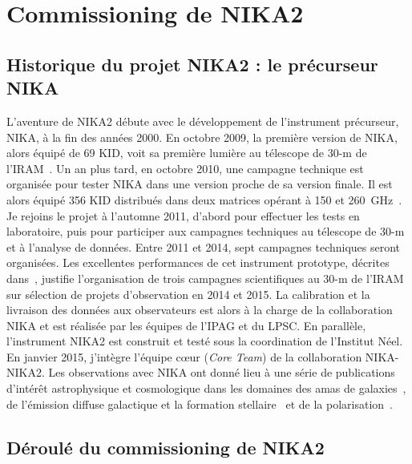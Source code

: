 %
%
%
%
%
%
%
\section{Commissioning de NIKA2}
\label{se:commissioning}

\subsection{Historique du projet NIKA2 : le précurseur NIKA}
\label{se:nika}

L'aventure de NIKA2 débute avec le développement de l'instrument
précurseur, NIKA, à la fin des années 2000. En octobre 2009, la
première version de NIKA, alors équipé de 69 KID, voit sa première
lumière au télescope de 30-m de l'IRAM~\citep{Monfardini2010_NIKA}. Un
an plus tard, en octobre 2010, une campagne technique est organisée
pour tester NIKA dans une version proche de sa version finale. Il est
alors équipé 356 KID distribués dans deux matrices opérant à 150 et
260~GHz~\citep{Monfardini2011_NIKA}. Je rejoins le projet à l'automne
2011, d'abord pour effectuer les tests en laboratoire, puis pour
participer aux campagnes techniques au télescope de 30-m et à
l'analyse de données. Entre 2011
et 2014, sept campagnes techniques seront organisées. Les excellentes
performances de cet instrument prototype, décrites
dans~\citet{Catalano2014}, justifie l'organisation de trois campagnes
scientifiques au 30-m de l'IRAM sur sélection de projets d'observation
en 2014 et 2015. La calibration et
la livraison des données aux observateurs est alors à la charge de la
collaboration NIKA et est réalisée par les équipes de l'IPAG et du
LPSC. En parallèle, l'instrument NIKA2 est construit et testé sous
la coordination de l'Institut Néel. En janvier 2015, j'intègre
l'équipe c\oe ur (\emph{Core Team}) de la collaboration NIKA-NIKA2. Les
observations avec NIKA ont donné lieu à une série de publications
d'intérêt astrophysique et cosmologique dans les domaines des amas de
galaxies~\citep{Adam2014, Adam2015, Adam2016, Adam2017, Adam2017kSZ,
  Adam2018, Ruppin2017, Romero2018}, de l'émission diffuse
galactique et la formation stellaire~\citep{Bracco2017, Chacon2017,
  Rigby2018} et de la polarisation~\citep{Ritacco2018}.

\subsection{Déroulé du commissioning de NIKA2}
\label{se:historic}

